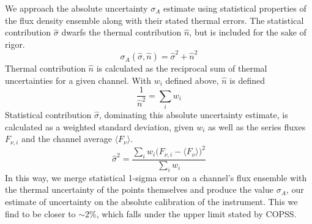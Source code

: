 \documentclass{article}
\begin{document}
	We approach the absolute uncertainty $\sigma_{A}$ estimate using statistical properties of the flux density ensemble along with their stated thermal errors.
	The statistical contribution $\hat{\sigma}$ dwarfs the thermal contribution $\hat{n}$, but is included for the sake of rigor.
	$$\sigma_{A}(\hat{\sigma}, \hat{n}) = \hat{\sigma}^{2} + \hat{n}^{2}$$
	Thermal contribution $\hat{n}$ is calculated as the reciprocal sum of thermal uncertainties for a given channel.
	With $w_{i}$ defined above, $\hat{n}$ is defined
	$$ \frac{1}{\hat{n}^{2}} = \sum_{i} w_{i} $$
	Statistical contribution $\hat{\sigma}$, dominating this absolute uncertainty estimate, is calculated as a weighted standard deviation, given $w_{i}$ as well as the series fluxes $F_{\nu,i}$ and the channel average $\langle F_{\nu} \rangle$.
	$$\hat{\sigma}^{2} = \frac{\sum_{i} w_{i} \big( F_{\nu,i} - \langle F_{\nu} \rangle \big)^{2} }{\sum_{i} w_{i}}$$
	In this way, we merge statistical 1-sigma error on a channel's flux ensemble with the thermal uncertainty of the points themselves and produce the value $\sigma_{A}$, our estimate of uncertainty on the absolute calibration of the instrument.
	This we find to be closer to $\sim2\%$, which falls under the upper limit stated by COPSS.
\end{document}
